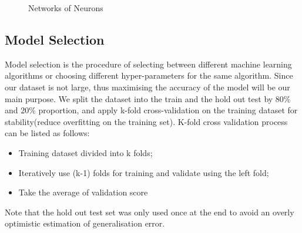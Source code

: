 \begin{figure}[H]
	\caption[Networks of Neurons for a $(L+1)$-layer perceptron.]{Networks of Neurons}
	\label{fig:multilayer-perceptron}
\end{figure}

\subsection{Model Selection}
Model selection is the procedure of selecting between different machine learning algorithms or choosing different hyper-parameters for the same algorithm. Since our dataset is not large, thus maximising the accuracy of the model will be our main purpose. We split the dataset into the train and the hold out test by 80\% and 20\% proportion, and apply k-fold cross-validation on the training dataset for stability(reduce overfitting on the training set). K-fold cross validation process can be listed as follows:
\begin{itemize}
   \item Training dataset divided into k folds;
   \item Iteratively use (k-1) folds for training and validate using the left fold;
   \item Take the average of validation score
   \end{itemize}
Note that the hold out test set was only used once at the end to avoid an overly optimistic estimation of generalisation error.
